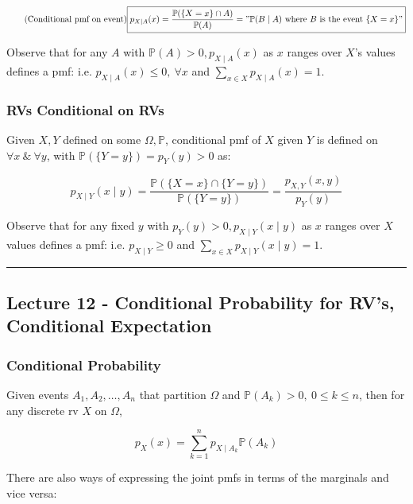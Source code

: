 \documentclass{article}
\begin{document}
\begin{equation}
  \tag{Conditional pmf on event}
  \boxed{
    p_{X\mid A}(x) = \frac{\mathbb{P}(\{X = x\} \cap A)}
    {\mathbb{P}(A)} = "\mathbb{P}(B \mid A) \text{ where } B \text{ is
      the event } \{X=x\}"
  }
\end{equation}

Observe that for any $A$ with $\mathbb{P}(A) > 0, p_{X\mid A}(x)$ as
$x$ ranges over $X$'s values defines a pmf: i.e. $p_{X\mid A}(x) \leq
0, \  \forall x$ and $\sum_{x \in X} p_{X\mid A}(x) = 1$.

\subsubsection{RVs Conditional on RVs}

Given $X,Y$ defined on some $\Omega, \mathbb{P}$, conditional pmf of
$X$ given $Y$ is defined on $\forall x \ \& \ \forall y$, with
$\mathbb{P}(\{Y=y\}) = p_Y(y) > 0$ as:

\begin{equation}
  \tag{Conditional pmf on rv}
  \boxed{
    p_{X\mid Y}(x\mid y) = \frac{\mathbb{P}(\{X=x\} \cap \{Y=y\})}
    {\mathbb{P}(\{Y=y\})} = \frac{p_{X,Y}(x,y)}{p_Y(y)}
  }
\end{equation}

Observe that for any fixed $y$ with $p_Y(y) > 0, p_{X\mid Y}(x\mid y)$
as $x$ ranges over $X$ values defines a pmf: i.e. $p_{X\mid Y} \geq 0$
and $\sum_{x \in X} p_{X\mid Y}(x\mid y) = 1$.


\medskip\hrule
\subsection{Lecture 12 - Conditional Probability for RV's, Conditional
  Expectation}

\subsubsection{Conditional Probability}

Given events $A_1, A_2, \dots, A_n$ that partition $\Omega$ and
$\mathbb{P}(A_k) > 0,\ 0 \leq k \leq n$, then for any discrete rv $X$ on
$\Omega$,

\begin{equation}
  \tag{Conditional Total Probability}
  \boxed{
    p_X(x) = \sum_{k=1}^n p_{X \mid A_k} \mathbb{P}(A_k)
  }
\end{equation}

There are also ways of expressing the joint pmfs in terms of the
marginals and vice versa:
\end{document}
